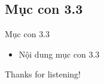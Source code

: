 \documentclass{beamer}
\begin{document}
\subsection{Mục con 3.3}
\begin{frame}{Mục con 3.3}
\begin{itemize}
\item Nội dung mục con 3.3
\end{itemize}
\end{frame}






\begin{frame}{}
\centering
\Huge{Thanks for listening!}
\end{frame}
\end{document}

